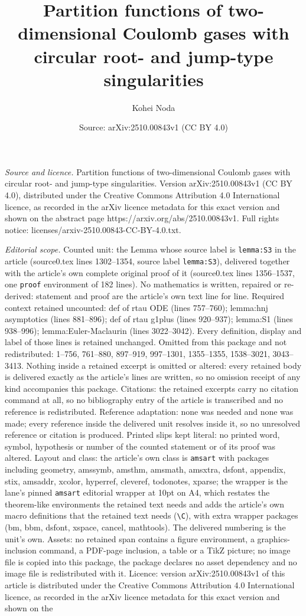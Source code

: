 \documentclass[10pt,a4paper]{amsart}
\title[Partition functions of two-dimensional Coulomb gases with ci]{Partition functions of two-dimensional Coulomb gases with circular root- and jump-type singularities}
\author{Kohei Noda}
\date{Source: arXiv:2510.00843v1 (CC BY 4.0)}
\begin{document}
\maketitle

\noindent\emph{Source and licence.} Partition functions of two-dimensional Coulomb gases with circular root- and jump-type singularities. Version arXiv:2510.00843v1 (CC BY 4.0), distributed under the Creative Commons Attribution 4.0 International licence, as recorded in the arXiv licence metadata for this exact version and shown on the abstract page https://arxiv.org/abs/2510.00843v1. Full rights notice: licenses/arxiv-2510.00843-CC-BY-4.0.txt.\par\smallskip

\noindent\textit{Editorial scope.} Counted unit: the Lemma whose source label is \texttt{lemma:S3} in the article (source0.tex lines 1302--1354, source label \texttt{lemma:S3}), delivered together with the article's own complete original proof of it (source0.tex lines 1356--1537, one \texttt{proof} environment of 182 lines). No mathematics is written, repaired or re-derived: statement and proof are the article's own text line for line. Required context retained uncounted: def of rtau ODE (lines 757--760); lemma:hnj asymptotics (lines 881--896); def of rtau g1plus (lines 920--937); lemma:S1 (lines 938--996); lemma:Euler-Maclaurin (lines 3022--3042). Every definition, display and label of those lines is retained unchanged. Omitted from this package and not redistributed: 1--756, 761--880, 897--919, 997--1301, 1355--1355, 1538--3021, 3043--3413. Nothing inside a retained excerpt is omitted or altered: every retained body is delivered exactly as the article's lines are written, so no omission receipt of any kind accompanies this package. Citations: the retained excerpts carry no citation command at all, so no bibliography entry of the article is transcribed and no reference is redistributed. Reference adaptation: none was needed and none was made; every reference inside the delivered unit resolves inside it, so no unresolved reference or citation is produced. Printed slips kept literal: no printed word, symbol, hypothesis or number of the counted statement or of its proof was altered. Layout and class: the article's own class is \texttt{amsart} with packages including geometry, amssymb, amsthm, amsmath, amsxtra, dsfont, appendix, stix, amsaddr, xcolor, hyperref, cleveref, todonotes, xparse; the wrapper is the lane's pinned \texttt{amsart} editorial wrapper at 10pt on A4, which restates the theorem-like environments the retained text needs and adds the article's own macro definitions that the retained text needs (\texttt{\textbackslash C}), with extra wrapper packages (bm, bbm, dsfont, xspace, cancel, mathtools). The delivered numbering is the unit's own. Assets: no retained span contains a figure environment, a graphics-inclusion command, a PDF-page inclusion, a table or a TikZ picture; no image file is copied into this package, the package declares no asset dependency and no image file is redistributed with it. Licence: version arXiv:2510.00843v1 of this article is distributed under the Creative Commons Attribution 4.0 International licence, as recorded in the arXiv licence metadata for this exact version and shown on the 
\end{document}
